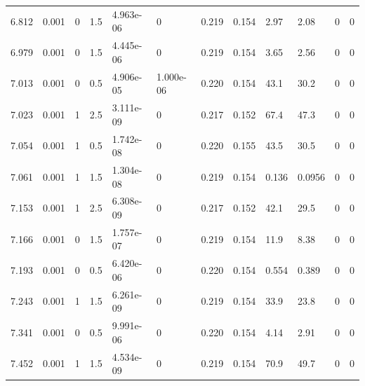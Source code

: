 \documentclass[preview]{standalone}
\begin{document}
{{{\begin{tabular}{L{1.2cm}C{1.2cm} C{0.3cm}C{0.5cm} C{1.4cm}C{1.4cm} C{1.4cm}C{1.4cm} C{1.6cm}C{1.6cm} C{1.6cm}C{1.6cm}}
  6.812  &  0.001  & 0     & 1.5 &  4.963e-06  & 0  &  0.219&   0.154& 2.97 & 2.08   &  0 & 0  \\ 
  6.979  &  0.001  & 0     & 1.5 &  4.445e-06  & 0  &  0.219&   0.154& 3.65 & 2.56   &  0 & 0  \\ 
  7.013  &  0.001  & 0     & 0.5 &  4.906e-05  & 1.000e-06  &  0.220&   0.154& 43.1 & 30.2   &  0 & 0  \\ 
  7.023  &  0.001  & 1     & 2.5 &  3.111e-09  & 0  &  0.217&   0.152& 67.4 & 47.3   &  0 & 0  \\ 
  7.054  &  0.001  & 1     & 0.5 &  1.742e-08  & 0  &  0.220&   0.155& 43.5 & 30.5   &  0 & 0  \\ 
  7.061  &  0.001  & 1     & 1.5 &  1.304e-08  & 0  &  0.219&   0.154& 0.136 & 0.0956   &  0 & 0  \\ 
  7.153  &  0.001  & 1     & 2.5 &  6.308e-09  & 0  &  0.217&   0.152& 42.1 & 29.5   &  0 & 0  \\ 
  7.166  &  0.001  & 0     & 1.5 &  1.757e-07  & 0  &  0.219&   0.154& 11.9 & 8.38   &  0 & 0  \\ 
  7.193  &  0.001  & 0     & 0.5 &  6.420e-06  & 0  &  0.220&   0.154& 0.554 & 0.389   &  0 & 0  \\ 
  7.243  &  0.001  & 1     & 1.5 &  6.261e-09  & 0  &  0.219&   0.154& 33.9 & 23.8   &  0 & 0  \\ 
  7.341  &  0.001  & 0     & 0.5 &  9.991e-06  & 0  &  0.220&   0.154& 4.14 & 2.91   &  0 & 0  \\ 
  7.452  &  0.001  & 1     & 1.5 &  4.534e-09  & 0  &  0.219&   0.154& 70.9 & 49.7   &  0 & 0  \\ 
\hline 
\end{tabular} 

}}}
\end{document}
